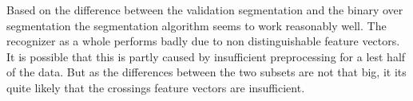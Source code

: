 Based on the difference between the validation segmentation and the binary over segmentation the segmentation algorithm seems to work reasonably well. The recognizer as a whole performs badly due to non distinguishable feature vectors. It is possible that this is partly caused by insufficient preprocessing for a lest half of the data. But as the differences between the two subsets are not that big, it its quite likely that the crossings feature vectors are insufficient.